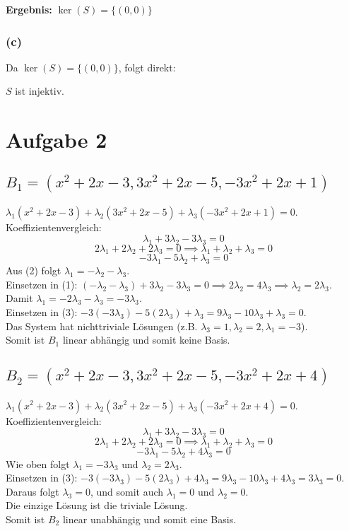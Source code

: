 \documentclass{article}
\begin{document}
\textbf{Ergebnis:} \( \ker(S) = \{(0, 0)\} \)

\subsubsection*{(c)}
Da \( \ker(S) = \{(0, 0)\} \), folgt direkt:

\( S \) ist injektiv.

\section*{Aufgabe 2}
\subsection*{$B_1 = (x^2+2x-3, 3x^2+2x-5, -3x^2+2x+1)$}
$\lambda_1(x^2+2x-3) + \lambda_2(3x^2+2x-5) + \lambda_3(-3x^2+2x+1) = 0$. \\ 
Koeffizientenvergleich:
\[ \lambda_1 + 3\lambda_2 - 3\lambda_3 = 0 \]
\[ 2\lambda_1 + 2\lambda_2 + 2\lambda_3 = 0 \implies \lambda_1 + \lambda_2 + \lambda_3 = 0 \]
\[ -3\lambda_1 - 5\lambda_2 + \lambda_3 = 0 \]
Aus (2) folgt $\lambda_1 = -\lambda_2 - \lambda_3$. \\
Einsetzen in (1): $(-\lambda_2 - \lambda_3) + 3\lambda_2 - 3\lambda_3 = 0 \implies 2\lambda_2 = 4\lambda_3 \implies \lambda_2 = 2\lambda_3$. \\
Damit $\lambda_1 = -2\lambda_3 - \lambda_3 = -3\lambda_3$. \\
Einsetzen in (3): $-3(-3\lambda_3) - 5(2\lambda_3) + \lambda_3 = 9\lambda_3 - 10\lambda_3 + \lambda_3 = 0$. \\
Das System hat nichttriviale Lösungen (z.B. $\lambda_3=1, \lambda_2=2, \lambda_1=-3$). \\
Somit ist $B_1$ linear abhängig und somit keine Basis.

\subsection*{$B_2 = (x^2+2x-3, 3x^2+2x-5, -3x^2+2x+4)$}
$\lambda_1(x^2+2x-3) + \lambda_2(3x^2+2x-5) + \lambda_3(-3x^2+2x+4) = 0$. \\
Koeffizientenvergleich:
\[ \lambda_1 + 3\lambda_2 - 3\lambda_3 = 0 \]
\[ 2\lambda_1 + 2\lambda_2 + 2\lambda_3 = 0 \implies \lambda_1 + \lambda_2 + \lambda_3 = 0 \]
\[ -3\lambda_1 - 5\lambda_2 + 4\lambda_3 = 0 \]
Wie oben folgt $\lambda_1 = -3\lambda_3$ und $\lambda_2 = 2\lambda_3$. \\
Einsetzen in (3): $-3(-3\lambda_3) - 5(2\lambda_3) + 4\lambda_3 = 9\lambda_3 - 10\lambda_3 + 4\lambda_3 = 3\lambda_3 = 0$. \\
Daraus folgt $\lambda_3 = 0$, und somit auch $\lambda_1 = 0$ und $\lambda_2 = 0$. \\
Die einzige Lösung ist die triviale Lösung. \\
Somit ist $B_2$  linear unabhängig und somit eine Basis.
\end{document}
